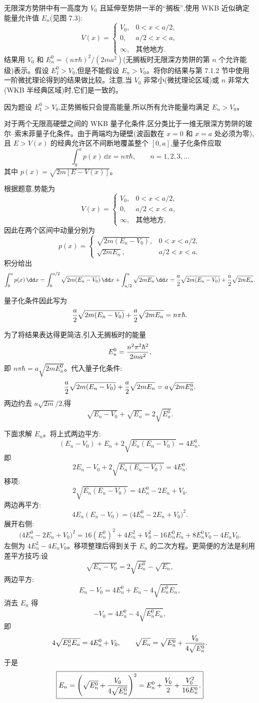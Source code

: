\begin{question}
无限深方势阱中有一高度为 $V_0$ 且延伸至势阱一半的“搁板”,使用 WKB 近似确定能量允许值 $E_n$(见图 7.3):
\[
V(x)=\begin{cases}
V_0, & 0<x<a/2,\\
0, & a/2<x<a,\\
\infty, & \text{其他地方}.
\end{cases}
\]
结果用 $V_0$ 和 $E_n^0=(n\pi\hbar)^2/(2ma^2)$(无搁板时无限深方势阱的第 $n$ 个允许能级)表示。假设 $E_1^0>V_0$,但是不能假设 $E_n>V_0$。将你的结果与第 7.1.2 节中使用一阶微扰理论得到的结果做比较。注意,当 $V_0$ 非常小(微扰理论区域)或 $n$ 非常大(WKB 半经典区域)时,它们是一致的。
\begin{solution}
因为题设 $E_1^0>V_0$,正势搁板只会提高能量,所以所有允许能量均满足 $E_n>V_0$。

对于两个无限高硬壁之间的 WKB 量子化条件,区分类比于一维无限深方势阱的玻尔--索末菲量子化条件。由于两端均为硬壁(波函数在 $x=0$ 和 $x=a$ 处必须为零),且 $E>V(x)$ 的经典允许区不间断地覆盖整个 $[0,a]$,量子化条件应取
\[
\int_0^a p(x)\,\dd x=n\pi\hbar,
\qquad n=1,2,3,\ldots
\]
其中 $p(x)=\sqrt{2m[E-V(x)]}$。

根据题意,势能为
\[
V(x)=\begin{cases}
V_0, & 0<x<a/2,\\[2pt]
0, & a/2<x<a,\\[2pt]
\infty, & \text{其他地方},
\end{cases}
\]
因此在两个区间中动量分别为
\[
p(x)= \begin{cases}
\sqrt{2m(E_n-V_0)}, & 0<x<a/2,\\[4pt]
\sqrt{2mE_n}, & a/2<x<a.
\end{cases}
\]
积分给出
\[
\int_0^a p(x)\,\dd x
=\int_0^{a/2}\sqrt{2m(E_n-V_0)}\,\dd x
+\int_{a/2}^a\sqrt{2mE_n}\,\dd x
={a\over2}\sqrt{2m(E_n-V_0)}+{a\over2}\sqrt{2mE_n}.
\]

量子化条件因此写为
\[
{a\over2}\sqrt{2m(E_n-V_0)}+{a\over2}\sqrt{2mE_n}=n\pi\hbar.
\]

为了将结果表达得更简洁,引入无搁板时的能量
\[
E_n^0={n^2\pi^2\hbar^2\over2ma^2},
\]
即 $n\pi\hbar = a\sqrt{2mE_n^0}$。代入量子化条件:
\[
{a\over2}\sqrt{2m(E_n-V_0)}+{a\over2}\sqrt{2mE_n}
=a\sqrt{2mE_n^0}.
\]
两边约去 $a\sqrt{2m}/2$,得
\[
\sqrt{E_n-V_0}+\sqrt{E_n}=2\sqrt{E_n^0}.
\]

下面求解 $E_n$。将上式两边平方:
\[
(E_n-V_0)+E_n+2\sqrt{E_n(E_n-V_0)}=4E_n^0,
\]
即
\[
2E_n-V_0+2\sqrt{E_n(E_n-V_0)}=4E_n^0.
\]
移项:
\[
2\sqrt{E_n(E_n-V_0)}=4E_n^0-2E_n+V_0.
\]
两边再平方:
\[
4E_n(E_n-V_0)=\bigl(4E_n^0-2E_n+V_0\bigr)^2.
\]
展开右侧:
\[
\bigl(4E_n^0-2E_n+V_0\bigr)^2
=16(E_n^0)^2+4E_n^2+V_0^2-16E_n^0E_n+8E_n^0V_0-4E_nV_0.
\]
左侧为 $4E_n^2-4E_nV_0$。移项整理后得到关于 $E_n$ 的二次方程。更简便的方法是利用差平方技巧:设
\[
\sqrt{E_n-V_0}=2\sqrt{E_n^0}-\sqrt{E_n},
\]
两边平方:
\[
E_n-V_0=4E_n^0+E_n-4\sqrt{E_n^0E_n},
\]
消去 $E_n$ 得
\[
-V_0=4E_n^0-4\sqrt{E_n^0E_n},
\]
即
\[
4\sqrt{E_n^0E_n}=4E_n^0+V_0,
\qquad
\sqrt{E_n}=\sqrt{E_n^0}+{V_0\over4\sqrt{E_n^0}}.
\]
于是
\[
\boxed{E_n=\left(\sqrt{E_n^0}+{V_0\over4\sqrt{E_n^0}}\right)^2
=E_n^0+{V_0\over2}+{V_0^2\over16E_n^0}.}
\]


\end{solution}
\end{question}
